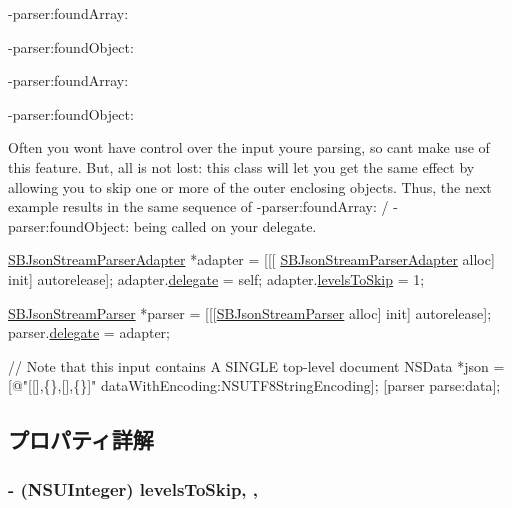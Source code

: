 \begin{DoxyItemize}
\item -\/parser\+:found\+Array\+: \item -\/parser\+:found\+Object\+: \item -\/parser\+:found\+Array\+: \item -\/parser\+:found\+Object\+:\end{DoxyItemize}
Often you won\textquotesingle{}t have control over the input you\textquotesingle{}re parsing, so can\textquotesingle{}t make use of this feature. But, all is not lost\+: this class will let you get the same effect by allowing you to skip one or more of the outer enclosing objects. Thus, the next example results in the same sequence of -\/parser\+:found\+Array\+: / -\/parser\+:found\+Object\+: being called on your delegate.


\begin{DoxyCode}
\hyperlink{interface_s_b_json_stream_parser_adapter}{SBJsonStreamParserAdapter} *adapter = [[[
      \hyperlink{interface_s_b_json_stream_parser_adapter}{SBJsonStreamParserAdapter} alloc] init] autorelease];
adapter.\hyperlink{interface_s_b_json_stream_parser_adapter_a9d336f9c9e1caf3291f80918cb13188e}{delegate} = \textcolor{keyword}{self};
adapter.\hyperlink{interface_s_b_json_stream_parser_adapter_a1b7451c67d9149b14632c228909659bb}{levelsToSkip} = 1;

\hyperlink{interface_s_b_json_stream_parser}{SBJsonStreamParser} *parser = [[[\hyperlink{interface_s_b_json_stream_parser}{SBJsonStreamParser} alloc] init] 
      autorelease];
parser.\hyperlink{interface_s_b_json_stream_parser_a1a4e90ce1ca9b55e7696db77ef6bf20c}{delegate} = adapter;

\textcolor{comment}{// Note that this input contains A SINGLE top-level document}
NSData *json = [\textcolor{stringliteral}{@"[[],\{\},[],\{\}]"} dataWithEncoding:NSUTF8StringEncoding]; 
[parser parse:data];
\end{DoxyCode}
 

\subsection{プロパティ詳解}
\hypertarget{interface_s_b_json_stream_parser_adapter_a1b7451c67d9149b14632c228909659bb}{}
\subsubsection[{levels\+To\+Skip}]{\setlength{\rightskip}{0pt plus 5cm}-\/ (N\+S\+U\+Integer) levels\+To\+Skip\hspace{0.3cm}{\ttfamily [read]}, {\ttfamily [write]}, {\ttfamily [atomic]}}\label{interface_s_b_json_stream_parser_adapter_a1b7451c67d9149b14632c228909659bb}


